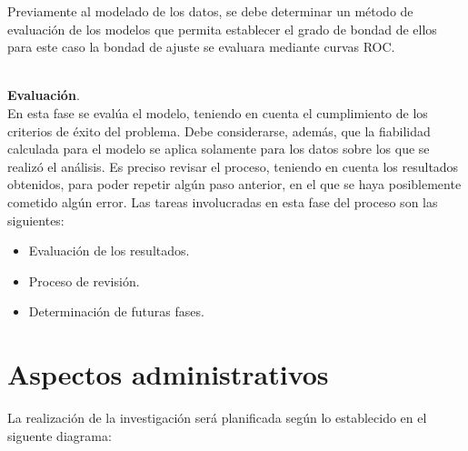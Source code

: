 Previamente al modelado de los datos, se debe determinar un método de evaluación de los modelos que permita establecer el grado de bondad de ellos para este caso la bondad de ajuste se evaluara mediante curvas ROC.\\\

\noindent
\textbf{Evaluación}.\\

	En esta fase se evalúa el modelo, teniendo en cuenta el cumplimiento de los criterios de éxito del problema. Debe considerarse, además, que la fiabilidad calculada para el modelo se aplica solamente para los datos sobre los que se realizó el análisis. Es preciso revisar el proceso, teniendo en cuenta los resultados obtenidos, para poder repetir algún paso anterior, en el que se haya posiblemente cometido algún error. Las tareas involucradas en esta fase del proceso son las siguientes:\\

\begin{itemize}
\item	Evaluación de los resultados.
\item	Proceso de revisión.
\item	Determinación de futuras fases.
\end{itemize}

\section{Aspectos administrativos}

\vspace{1 cm}
La realización de la investigación será planificada según lo establecido en el siguente diagrama:\\

